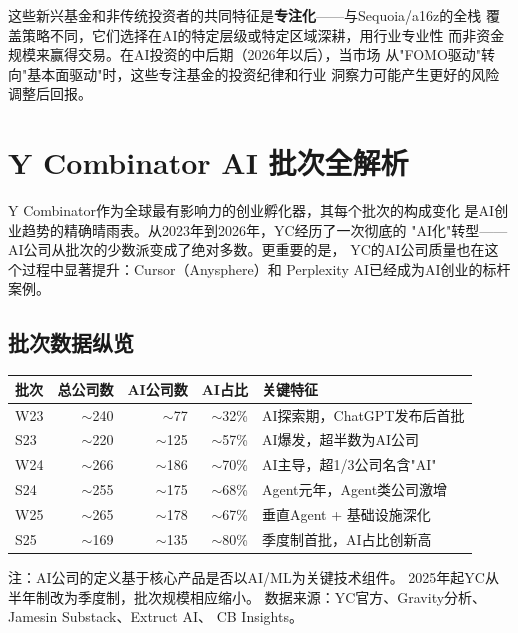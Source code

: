 这些新兴基金和非传统投资者的共同特征是\textbf{专注化}——与Sequoia/a16z的全栈
覆盖策略不同，它们选择在AI的特定层级或特定区域深耕，用行业专业性
而非资金规模来赢得交易。在AI投资的中后期（2026年以后），当市场
从"FOMO驱动"转向"基本面驱动"时，这些专注基金的投资纪律和行业
洞察力可能产生更好的风险调整后回报。


\section{Y Combinator AI 批次全解析}
\label{sec:fund-yc}

Y Combinator作为全球最有影响力的创业孵化器，其每个批次的构成变化
是AI创业趋势的精确晴雨表。从2023年到2026年，YC经历了一次彻底的
"AI化"转型——AI公司从批次的少数派变成了绝对多数。更重要的是，
YC的AI公司质量也在这个过程中显著提升：Cursor（Anysphere）和
Perplexity AI已经成为AI创业的标杆案例。

\subsection{批次数据纵览}
\label{subsec:fund-yc-overview}

\begin{keybox}
\small
\begin{tabularx}{\textwidth}{l r r r X}
\toprule
\rowcolor{figLightGray}
\textbf{批次} & \textbf{总公司数} & \textbf{AI公司数}
  & \textbf{AI占比} & \textbf{关键特征} \\
\midrule
W23  & $\sim$240 & $\sim$77   & $\sim$32\%
  & AI探索期，ChatGPT发布后首批 \\
S23  & $\sim$220 & $\sim$125  & $\sim$57\%
  & AI爆发，超半数为AI公司 \\
W24  & $\sim$266 & $\sim$186  & $\sim$70\%
  & AI主导，超1/3公司名含"AI" \\
S24  & $\sim$255 & $\sim$175  & $\sim$68\%
  & Agent元年，Agent类公司激增 \\
W25  & $\sim$265 & $\sim$178  & $\sim$67\%
  & 垂直Agent + 基础设施深化 \\
S25  & $\sim$169 & $\sim$135  & $\sim$80\%
  & 季度制首批，AI占比创新高 \\
\bottomrule
\end{tabularx}

\medskip
\noindent 注：AI公司的定义基于核心产品是否以AI/ML为关键技术组件。
2025年起YC从半年制改为季度制，批次规模相应缩小。
数据来源：YC官方、Gravity分析、Jamesin Substack、Extruct AI、
CB Insights。
\end{keybox}

